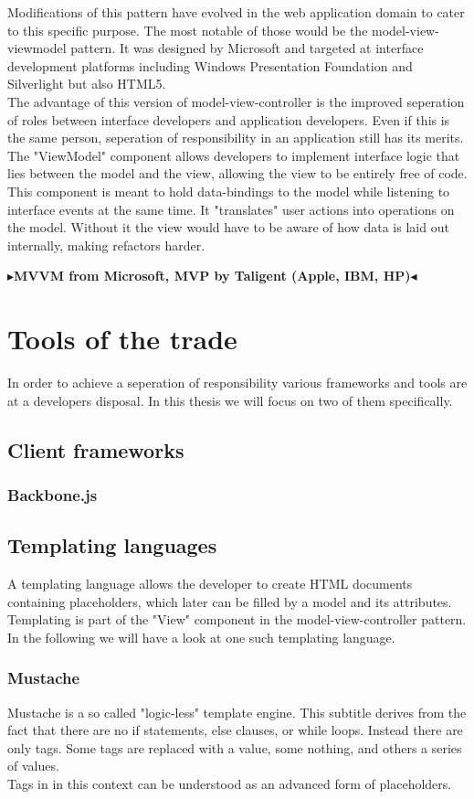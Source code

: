 \documentclass[twoside,11pt,openright]{report}
\newcommand{\todo}[1]{{\color[rgb]{.5,0,0}\textbf{$\blacktriangleright$#1$\blacktriangleleft$}}}
\begin{document}
Modifications of this pattern have evolved in the web application domain to
cater to this specific purpose. The most notable of those would be the
model-view-viewmodel pattern. It was designed by Microsoft and targeted at
interface development platforms including Windows Presentation Foundation and
Silverlight but also HTML5.\\
The advantage of this version of model-view-controller is the improved
seperation of roles between interface developers and application developers.
Even if this is the same person, seperation of responsibility in an application
still has its merits.\\
The "ViewModel" component allows developers to implement interface logic that
lies between the model and the view, allowing the view to be entirely free
of code. This component is meant to hold data-bindings to the model while
listening to interface events at the same time. It "translates" user actions
into operations on the model. Without it the view would have to be aware of how
data is laid out internally, making refactors harder.

\todo{MVVM from Microsoft, MVP by Taligent (Apple, IBM, HP)}


\chapter{Tools of the trade}
In order to achieve a seperation of responsibility various frameworks and tools
are at a developers disposal. In this thesis we will focus on two of them
specifically.
\section{Client frameworks}
\subsection{Backbone.js}
\section{Templating languages}
A templating language allows the developer to create HTML documents containing
placeholders, which later can be filled by a model and its attributes.
Templating is part of the "View" component in the model-view-controller
pattern. In the following we will have a look at one such templating language.
\subsection{Mustache}
Mustache is a so called "logic-less" template engine.
This subtitle derives from the fact that there are no if statements,
else clauses, or while loops. Instead there are only tags. Some tags are
replaced with a value, some nothing, and others a series of values.\\
Tags in in this context can be understood as an advanced form of placeholders.
\end{document}
